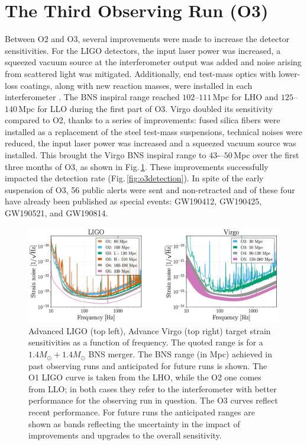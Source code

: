 \documentclass[binding=0.6cm, LaM]{sapthesis}
\begin{document}
\section{The Third Observing Run (O3)}

	Between O2 and O3, several improvements were made to increase the detector sensitivities.  For the LIGO detectors, 
	the input laser power was increased, a squeezed vacuum source 
	at the interferometer output was added and noise arising from scattered light was mitigated.  
	Additionally, end test-mass optics with lower-loss coatings, 
	along with new reaction masses, 
	were installed in each interferometer \cite{53}. 
	The BNS inspiral range reached $102$--$111\,$Mpc for LHO and $125$--$140\,$Mpc for LLO during the first part of O3.
	Virgo doubled its sensitivity compared to O2, 
	thanks to a series of improvements: 
	fused silica fibers were installed as a replacement of the steel test-mass suspensions, 
	technical noises were reduced, the input laser power was increased 
	and a squeezed vacuum source was installed. 
	This brought the Virgo BNS inspiral range to $43$-–$50\,$Mpc over the first three months of O3, 
	as shown in Fig.\,\ref{fig:o3bnsrange}. 
	These improvements successfully impacted the detection rate (Fig.\,\ref{fig:o3detection}).  
	In spite of the early suspension of O3, 
	56 public alerts were sent and non-retracted and of these four 
	have already been published as special events: 
	GW190412, GW190425, GW190521, and GW190814.
        
        \begin{figure}[!t]
          \label{o3bnsrange}
          \includegraphics[scale=0.5]{o3bnsrange}
          \centering
          \caption{Advanced LIGO (top left), Advance Virgo (top right) target strain sensitivities as a function of frequency. The quoted range is for a $1.4M_\odot + 1.4M_\odot$ BNS merger.  The BNS range (in Mpc) achieved in past observing runs and anticipated for future runs is shown.  The O1 LIGO curve is taken from the LHO, while the O2 one comes from LLO; in both cases they refer to the interferometer with better performance for the observing run in question. The O3 curves reflect recent performance. For future runs the anticipated ranges are shown as bands reflecting the uncertainty in the impact of improvements and upgrades to the overall sensitivity. \cite{53}}
          \label{fig:o3bnsrange}
        \end{figure}
\end{document}
